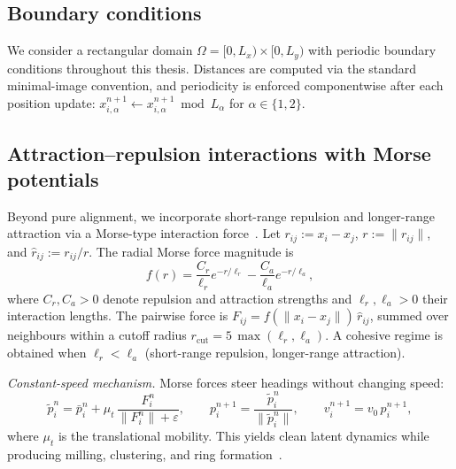 
\subsection{Boundary conditions}
\label{sec:boundary_conditions}

We consider a rectangular domain $\Omega = [0,L_x)\times[0,L_y)$
with periodic boundary conditions throughout this thesis.
Distances are computed via the standard minimal-image convention,
and periodicity is enforced componentwise after each position update:
$x_{i,\alpha}^{n+1} \leftarrow x_{i,\alpha}^{n+1} \bmod L_\alpha$
for $\alpha\in\{1,2\}$.

\subsection{Attraction--repulsion interactions with Morse potentials}
\label{sec:morse_forces}

Beyond pure alignment, we incorporate short-range repulsion and
longer-range attraction via a Morse-type interaction
force~\cite{dorsogna2006morse}.
Let $r_{ij} := x_i - x_j$, $r := \|r_{ij}\|$, and
$\hat r_{ij} := r_{ij}/r$.  The radial Morse force magnitude is
\begin{equation}
f(r)
=
\frac{C_r}{\ell_r} e^{-r/\ell_r}
-
\frac{C_a}{\ell_a} e^{-r/\ell_a},
\label{eq:morse_fr}
\end{equation}
where $C_r,C_a>0$ denote repulsion and attraction strengths and
$\ell_r,\ell_a>0$ their interaction lengths.
The pairwise force is
$F_{ij} = f(\|x_i-x_j\|)\,\hat r_{ij}$,
summed over neighbours within a cutoff radius
$r_{\mathrm{cut}} = 5\,\max(\ell_r,\ell_a)$.
A cohesive regime is obtained when $\ell_r<\ell_a$ (short-range
repulsion, longer-range attraction).

\emph{Constant-speed mechanism.}\;
Morse forces steer headings without changing speed:
\begin{equation}
\tilde p_i^n
=
\bar p_i^n
+
\mu_t\,\frac{F_i^n}{\|F_i^n\|+\varepsilon},
\qquad
p_i^{n+1}
=
\frac{\tilde p_i^n}{\|\tilde p_i^n\|},
\qquad
v_i^{n+1}
=
v_0\,p_i^{n+1},
\label{eq:direction_only_force_update}
\end{equation}
where $\mu_t$ is the translational mobility.
This yields clean latent dynamics while producing milling,
clustering, and ring formation~\cite{bhaskar2019topology}.

